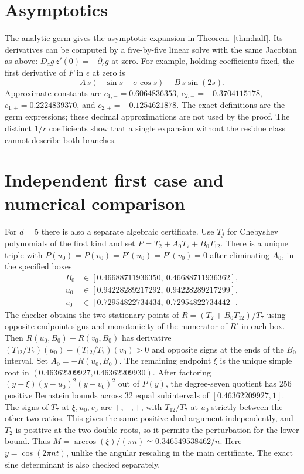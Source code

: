 \documentclass[11pt]{article}
\begin{document}
\section{Asymptotics}
The analytic germ gives the asymptotic expansion in
Theorem~\ref{thm:half}. Its derivatives can be computed by a
five-by-five linear solve with the same Jacobian as above:
\(D_zg\,z'(0)=-\partial_\epsilon g\) at zero.
For example, holding coefficients fixed, the first derivative of
\(F\) in \(\epsilon\) at zero is
\[
 A\,s(-\sin s+\sigma\cos s)-B\,s\sin(2s).
\]
Approximate constants are \(c_{1,-}=0.6064836353\),
\(c_{2,-}=-0.3704115178\), \(c_{1,+}=0.2224839370\), and
\(c_{2,+}=-0.1254621878\). The exact definitions are the germ
expressions; these decimal approximations are not used by the proof.
The distinct \(1/r\) coefficients show that a single expansion
without the residue class cannot describe both branches.

\clearpage
\section{Independent first case and numerical comparison}
For \(d=5\) there is also a separate algebraic certificate.
Use \(T_j\) for Chebyshev polynomials of the first kind and set
\(P=T_2+A_0T_7+B_0T_{12}\). There is a unique triple with
\(P(u_0)=P(v_0)=P'(u_0)=P'(v_0)=0\) after eliminating \(A_0\),
in the specified boxes
\begin{align*}
 B_0&\in[0.46688711936350,\ 0.46688711936362],\\
 u_0&\in[0.94228289217292,\ 0.94228289217299],\\
 v_0&\in[0.72954822734434,\ 0.72954822734442].
\end{align*}
The checker obtains the two stationary points of
\(R=(T_2+B_0T_{12})/T_7\) using opposite endpoint signs
and monotonicity of the numerator of \(R'\) in each box.
Then \(R(u_0,B_0)-R(v_0,B_0)\) has derivative
\((T_{12}/T_7)(u_0)-(T_{12}/T_7)(v_0)>0\) and opposite
signs at the ends of the \(B_0\) interval.
Set \(A_0=-R(u_0,B_0)\). The remaining endpoint \(\xi\)
is the unique simple root in \((0.46362209927,0.46362209930)\).
After factoring \((y-\xi)(y-u_0)^2(y-v_0)^2\) out of \(P(y)\),
the degree-seven quotient has 256 positive Bernstein bounds
across 32 equal subintervals of \([0.46362209927,1]\).
The signs of \(T_7\) at \(\xi,u_0,v_0\) are \(+,-,+\),
with \(T_{12}/T_7\) at \(u_0\) strictly between the other two
ratios. This gives the same positive dual argument independently,
and \(T_2\) is positive at the two double roots, so it permits
the perturbation for the lower bound. Thus
\(M=\arccos(\xi)/(\pi n)\simeq0.346549538462/n\).
Here \(y=\cos(2\pi nt)\), unlike the angular rescaling in the main
certificate. The exact sine determinant is also checked separately.
\end{document}
